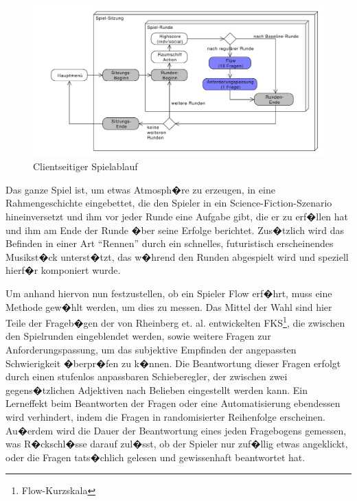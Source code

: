 \documentclass[a4paper,12pt]{scrartcl}
\begin{document}
\begin{figure}[htp]
\begin{center}
  \includegraphics[width=\textwidth]{SpielablaufClient}
  \caption{Clientseitiger Spielablauf}
  \label{fig:ClientSpielablauf}
\end{center}
\end{figure} 

Das ganze Spiel ist, um etwas Atmosph�re zu erzeugen, in eine Rahmengeschichte
eingebettet, die den Spieler in ein Science-Fiction-Szenario hineinversetzt und ihm vor jeder
Runde eine Aufgabe gibt, die er zu erf�llen hat und ihm am Ende der Runde �ber seine
Erfolge berichtet.\newline
Zus�tzlich wird das Befinden in einer Art "`Rennen"' durch ein schnelles, futuristisch
erscheinendes Musikst�ck unterst�tzt, das w�hrend den Runden abgespielt wird und
speziell hierf�r komponiert wurde.

Um anhand hiervon nun festzustellen, ob ein Spieler Flow erf�hrt, muss eine Methode
gew�hlt werden, um dies zu messen.\newline
Das Mittel der Wahl sind hier Teile der Frageb�gen der von Rheinberg et. al. \cite{Rheinberg2003}
entwickelten FKS\footnote{Flow-Kurzskala}, die zwischen den Spielrunden eingeblendet
werden, sowie weitere Fragen zur Anforderungspassung, um das subjektive Empfinden der angepassten Schwierigkeit
�berpr�fen zu k�nnen. Die Beantwortung dieser Fragen erfolgt durch einen stufenlos
anpassbaren Schieberegler, der zwischen zwei gegens�tzlichen Adjektiven nach
Belieben eingestellt werden kann. Ein Lerneffekt beim Beantworten der Fragen oder eine
Automatisierung ebendessen wird verhindert, indem die Fragen in randomisierter
Reihenfolge erscheinen. Au�erdem wird die Dauer der Beantwortung eines jeden
Fragebogens gemessen, was R�ckschl�sse darauf zul�sst, ob der Spieler nur zuf�llig etwas angeklickt, oder die Fragen tats�chlich
gelesen und gewissenhaft beantwortet hat.
\end{document}
